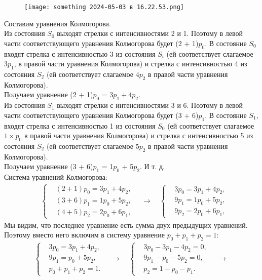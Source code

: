 \documentclass{article}
\begin{document}
\begin{figure}[h] 
\centering
\texttt{[image: something 2024-05-03 в 16.22.53.png]} %
\label{fig:my_label}
\end{figure}
\indent \; \; \;  Составим уравнения Колмогорова.
\\ 
\indent Из состояния $S_0$ выходят стрелки с интенсивностями 2 и 1. Поэтому в левой части соответствующего уравнения Колмогорова будет (2 + 1)$p_0$. В состояние $S_0$ входят стрелка с интенсивностью 3 из состояния $S_i$  (ей соответствует слагаемое $3p_1$,  в правой части уравнения Колмогорова) и стрелка с интенсивностью 4 из состояния $S_2$ (ей соответствует слагаемое $4p_2$ в правой части уравнения Колмогорова). \\ Получаем уравнение (2 + 1)$p_0$ = $3p_1 + 4p_2.$
 \\ \indent Из состояния $S_1$ выходят стрелки с интенсивностями 3 и 6. Поэтому в левой части соответствующего уравнения Колмогорова будет (3 + 6)$p_1$. В состояние $S_1$, входят стрелка с интенсивностью 1 из состояния $S_0$ (ей соответствует слагаемое $1 \times p_0$ в правой части уравнения Колмогорова) и стрелка с интенсивностью 5 из состояния $S_2$ (ей соответствует слагаемое $5p_2$ в правой части уравнения Колмогорова). \\  Получаем уравнение (3 + 6)$p_1$ = 1$p_0$ + 5$p_2$. И т. д. \\ \indent
 Система уравнений Колмогорова: \\ 
\[
\begin{aligned}
    &\left\{
    \begin{aligned}
       &(2 + 1)p_0 = 3p_1 + 4p_2,\\
        &(3 + 6)p_1 = 1p_0 + 5p_2, \\
        &(4 + 5)p_2 = 2p_0 + 6p_1,
    \end{aligned}
    \right.
    \quad \rightarrow \quad
    \left\{
    \begin{aligned}
        &3p_0 = 3p_1 + 4p_2, \\
        &9p_1 = 1p_0 + 5p_2, \\
        &9p_2 = 2p_0 + 6p_1,
    \end{aligned}
    \right.
\end{aligned}
\]
\indent Мы видим, что последнее уравнение есть сумма двух предыдущих уравнений.  Поэтому  вместо  него  включим  в  систему  уравнение
$p_0 + p_1 + p_2 = 1:$
\[
\begin{aligned}
    &\left\{
    \begin{aligned}
       &3p_0 = 3p_1 + 4p_2, \\
        &9p_1 = p_0 + 5p_2, \\
        &p_0 + p_1 + p_2 = 1.
    \end{aligned}
    \right.
    \quad \rightarrow \quad
    \left\{
    \begin{aligned}
         &3p_0 - 3p_1 - 4p_2 = 0, \\
        &9p_1 - p_0 - 5p_2 = 0, \\
        &p_2 = 1 - p_0 - p_1.
    \end{aligned}
    \right.
    \quad \rightarrow \quad
\end{aligned}
\]
\end{document}
